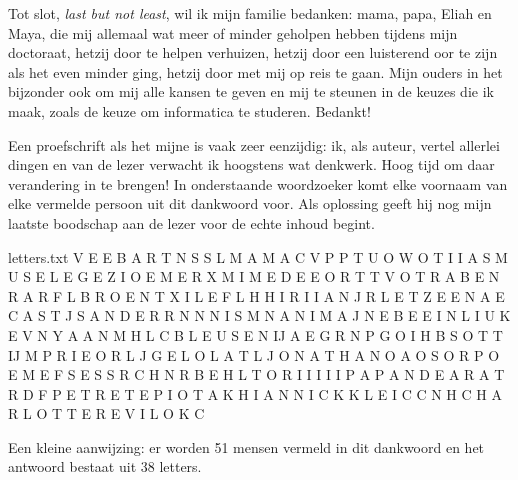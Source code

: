 \documentclass[main]{subfiles}
\begin{document}
Tot slot, \textit{last but not least}, wil ik mijn familie bedanken: mama, papa, Eliah en Maya, die mij allemaal wat meer of minder geholpen hebben tijdens mijn doctoraat, hetzij door te helpen verhuizen, hetzij door een luisterend oor te zijn als het even minder ging, hetzij door met mij op reis te gaan.
Mijn ouders in het bijzonder ook om mij alle kansen te geven en mij te steunen in de keuzes die ik maak, zoals de keuze om informatica te studeren.
Bedankt!

\pagebreak

Een proefschrift als het mijne is vaak zeer eenzijdig: ik, als auteur, vertel allerlei dingen en van de lezer verwacht ik hoogstens wat denkwerk.
Hoog tijd om daar verandering in te brengen!
In onderstaande woordzoeker komt elke voornaam van elke vermelde persoon uit dit dankwoord voor.
Als oplossing geeft hij nog mijn laatste boodschap aan de lezer voor de echte inhoud begint.

\begin{filecontents*}[overwrite]{letters.txt}
V E E B A R T N S S L M A M A C V
P P T U O W O T I I A S M U S E L
E G E Z I O E M E R X M I M E D E
E O R T T V O T R A B E N R A R F
L B R O E N T X I L E F L H H I R
I I A N J R L E T Z E E N A E C A
S T J S A N D E R R N N N I S M N
A N I M A J N E B E E I N L I U K
E V N Y A A N M H L C B L E U S E
N IJ A E G R N P G O I H B S O T T
IJ M P R I E O R L J G E L O L A T
L J O N A T H A N O A O S O R P O
E M E F S E S S R C H N R B E H L
T O R I I I I I P A P A N D E A R
A T R D F P E T R E T E P I O T A
K H I A N N I C K K L E I C C N H
C H A R L O T T E R E V I L O K C
\end{filecontents*}

\readarray*{}

\vspace{\fill}

\begin{wide}
\end{wide}

{\small Een kleine aanwijzing: er worden 51 mensen vermeld in dit dankwoord en het antwoord bestaat uit 38 letters.}



\end{document}
